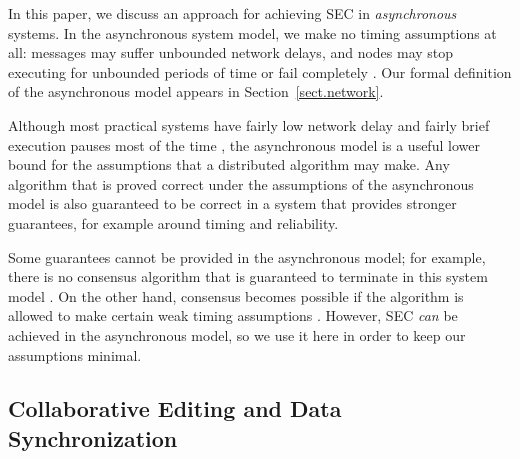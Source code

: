 In this paper, we discuss an approach for achieving SEC in \emph{asynchronous} systems. In the
asynchronous system model, we make no timing assumptions at all: messages may suffer unbounded
network delays, and nodes may stop executing for unbounded periods of time or fail completely
\cite{Cachin:2011wt}. Our formal definition of the asynchronous model appears in
Section~\ref{sect.network}.

Although most practical systems have fairly low network delay and fairly brief execution pauses most
of the time \cite{Bailis:2014jx}, the asynchronous model is a useful lower bound for the assumptions
that a distributed algorithm may make. Any algorithm that is proved correct under the assumptions of
the asynchronous model is also guaranteed to be correct in a system that provides stronger
guarantees, for example around timing and reliability.

Some guarantees cannot be provided in the asynchronous model; for example, there is no consensus
algorithm that is guaranteed to terminate in this system model \cite{Fischer:1985tt}. On the other
hand, consensus becomes possible if the algorithm is allowed to make certain weak timing assumptions
\cite{Chandra:1996cp}. However, SEC \emph{can} be achieved in the asynchronous model, so we use it
here in order to keep our assumptions minimal.


\subsection{Collaborative Editing and Data Synchronization}




